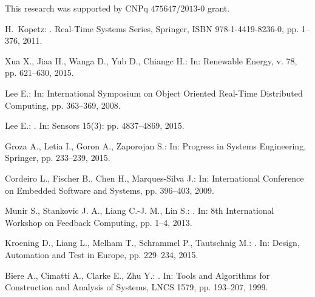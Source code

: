 \documentclass{acm_sen_article}
\begin{document}
This research was supported by CNPq $475647$/$2013$-$0$ grant.



\begin{thebibliography}{1}

H.~Kopetz:
.
\newblock Real-Time Systems Series, Springer, ISBN 978-1-4419-8236-0, pp. 1--376, 2011.

Xua X., Jiaa H., Wanga D., Yub D., Chiangc H.:
\newblock In: Renewable Energy, v. 78, pp. 621--630, 2015.

Lee E.:
\newblock In: International Symposium on Object Oriented Real-Time Distributed Computing, pp. 363--369, 2008.

Lee E.:
. 
\newblock In: Sensors 15(3): pp. 4837--4869, 2015.

Groza A., Letia I., Goron A., Zaporojan S.: 
\newblock In: Progress in Systems Engineering, Springer, pp. 233--239, 2015.

Cordeiro L., Fischer B., Chen H., Marques-Silva J.:
\newblock In: International Conference on Embedded Software and Systems, pp. 396--403, 2009.

Munir  S., Stankovic J. A., Liang C.-J. M., Lin S.:
. 
\newblock In: 8th International Workshop on Feedback Computing, pp. 1--4, 2013.

Kroening D., Liang L., Melham T., Schrammel P., Tautschnig M.:
. 
\newblock In: Design, Automation and Test in Europe, pp. 229--234, 2015.

Biere A., Cimatti A., Clarke E., Zhu Y.:
. 
\newblock In: Tools and Algorithms for Construction and Analysis of Systems, LNCS 1579, pp. 193--207, 1999.


\end{thebibliography}
\end{document}

